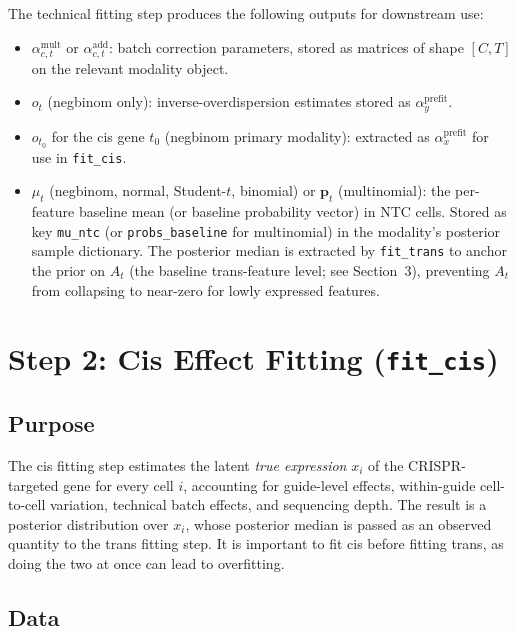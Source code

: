 \documentclass[12pt]{article}
\begin{document}
The technical fitting step produces the following outputs for downstream use:
\begin{itemize}
  \item $\alpha_{c,t}^{\text{mult}}$ or $\alpha_{c,t}^{\text{add}}$: batch correction
        parameters, stored as matrices of shape $[C, T]$ on the relevant modality object.
  \item $o_t$ (negbinom only): inverse-overdispersion estimates stored as
        $\alpha_y^{\text{prefit}}$.
  \item $o_{t_0}$ for the cis gene $t_0$ (negbinom primary modality): extracted as
        $\alpha_x^{\text{prefit}}$ for use in \texttt{fit\_cis}.
  \item $\mu_t$ (negbinom, normal, Student-$t$, binomial) or $\mathbf{p}_t$ (multinomial):
        the per-feature baseline mean (or baseline probability vector) in NTC cells.
        Stored as key \texttt{mu\_ntc} (or \texttt{probs\_baseline} for multinomial)
        in the modality's posterior sample dictionary.
        The posterior median is extracted by \texttt{fit\_trans} to anchor the prior on
        $A_t$ (the baseline trans-feature level; see Section~3), preventing $A_t$ from
        collapsing to near-zero for lowly expressed features.
\end{itemize}

\section{Step 2: Cis Effect Fitting (\texttt{fit\_cis})}
\label{sec:cis_fitting}

\subsection{Purpose}

The cis fitting step estimates the latent \emph{true expression} $x_i$ of the CRISPR-targeted
gene for every cell $i$, accounting for guide-level effects, within-guide cell-to-cell
variation, technical batch effects, and sequencing depth.
%
The result is a posterior distribution over $x_i$, whose posterior median is passed as an
observed quantity to the trans fitting step.
%
It is important to fit cis before fitting trans, as doing the two at once can lead to overfitting.

\subsection{Data}
\end{document}
